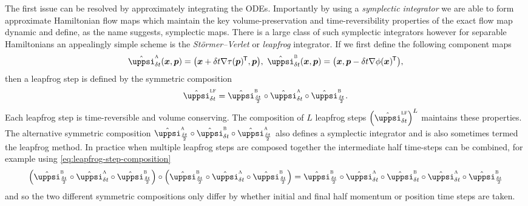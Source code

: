 The first issue can be resolved by approximately integrating the \acp{ODE}. Importantly by using a \emph{symplectic integrator} we are able to form approximate Hamiltonian flow maps which maintain the key volume-preservation and time-reversibility properties of the exact flow map dynamic and define, as the name suggests, symplectic maps. There is a large class of such symplectic integrators \citep{leimkuhler2004simulating} however for separable Hamiltonians an appealingly simple scheme is the \emph{St\"ormer--Verlet} or \emph{leapfrog} integrator. If we first define the following component maps
\begin{align}\label{eq:leapgfrog-component-steps}
  \hat{\flowmap}_{\delta t}^{\textsc{a}}(\vct{x},\vct{p}) = 
  \lpa\vct{x}+\delta t \nabla\tau(\vct{p})\tr,\vct{p}\rpa,
  ~
  \hat{\flowmap}_{\delta t}^{\textsc{b}}(\vct{x},\vct{p}) = 
  \lpa\vct{x},\vct{p}-\delta t \nabla\phi(\vct{x})\tr\rpa,
\end{align}
then a leapfrog step is defined by the symmetric composition
\begin{equation}\label{eq:leapfrog-step-composition}
  \hat{\flowmap}^{\textsc{lf}}_{\delta t} = 
  \hat{\flowmap}_{\frac{\delta t}{2}}^{\textsc{b}} \circ 
  \hat{\flowmap}_{\delta t}^{\textsc{a}} \circ 
  \hat{\flowmap}_{\frac{\delta t}{2}}^{\textsc{b}}.
\end{equation}
Each leapfrog step is time-reversible and volume conserving. The composition of $L$ leapfrog steps $\lpa\hat{\flowmap}^{\textsc{lf}}_{\delta t}\rpa^L$ maintains these properties. The alternative symmetric composition $\hat{\flowmap}_{\frac{\delta t}{2}}^{\textsc{a}} \circ \hat{\flowmap}_{\delta t}^{\textsc{b}} \circ \hat{\flowmap}_{\frac{\delta t}{2}}^{\textsc{a}}$ also defines a symplectic integrator and is also sometimes termed the leapfrog method. In practice when multiple leapfrog steps are composed together the intermediate half time-steps can be combined, for example using \eqref{eq:leapfrog-step-composition}
\begin{equation*}
  \lpa
  \hat{\flowmap}_{\frac{\delta t}{2}}^{\textsc{b}} \circ 
  \hat{\flowmap}_{\delta t}^{\textsc{a}} \circ 
  \hat{\flowmap}_{\frac{\delta t}{2}}^{\textsc{b}}
  \rpa
  \circ
  \lpa
  \hat{\flowmap}_{\frac{\delta t}{2}}^{\textsc{b}} \circ 
  \hat{\flowmap}_{\delta t}^{\textsc{a}} \circ 
  \hat{\flowmap}_{\frac{\delta t}{2}}^{\textsc{b}}
  \rpa
  =
  \hat{\flowmap}_{\frac{\delta t}{2}}^{\textsc{b}} \circ 
  \hat{\flowmap}_{\delta t}^{\textsc{a}} \circ 
  \hat{\flowmap}_{\delta t}^{\textsc{b}} \circ
  \hat{\flowmap}_{\delta t}^{\textsc{a}} \circ 
  \hat{\flowmap}_{\frac{\delta t}{2}}^{\textsc{b}}
\end{equation*}
and so the two different symmetric compositions only differ by whether initial and final half momentum or position time steps are taken. 

